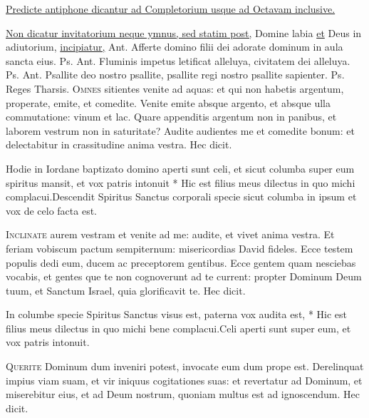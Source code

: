 \begin{multicols*}{2}
\newline \ul{Predicte antiphone dicantur ad Completorium usque ad Octavam inclusive.}
{\color{Red} }
\par \noindent \ul{Non dicatur invitatorium neque ymnus, sed statim post,} Domine labia \ul{et} Deus in adiutorium, \ul{incipiatur,} {\color{Red} Ant.} Afferte domino filii dei adorate dominum in aula sancta eius. {\color{Red} Ps.}  {\color{Red} Ant.} Fluminis impetus letificat alleluya, civitatem dei alleluya. {\color{Red} Ps.}  {\color{Red} Ant.} Psallite deo nostro psallite, psallite regi nostro psallite sapienter. {\color{Red} Ps.}  \V Reges Tharsis.
\lettrine[lines=2]{\zallmancaps \color{Red} O}{mnes} sitientes venite ad aquas: et qui non habetis argentum, properate, emite, et comedite. Venite emite absque argento, et absque ulla commutatione: vinum et lac. Quare appenditis argentum non in panibus, et laborem vestrum non in saturitate? Audite audientes me et comedite bonum: et delectabitur in crassitudine anima vestra. Hec dicit.
\begin{responsory}
{Hodie in Iordane baptizato domino aperti sunt celi, et sicut columba super eum spiritus mansit, et vox patris intonuit * Hic est filius meus dilectus in quo michi complacui.}{Descendit Spiritus Sanctus corporali specie sicut columba in ipsum et vox de celo facta est.}
\end{responsory}
\lettrine[lines=2]{\zallmancaps \color{Blue} I}{nclinate} aurem vestram et venite ad me: audite, et vivet anima vestra. Et feriam vobiscum pactum sempiternum: misericordias David fideles. Ecce testem populis dedi eum, ducem ac preceptorem gentibus. Ecce gentem quam nesciebas vocabis, et gentes que te non cognoverunt ad te current: propter Dominum Deum tuum, et Sanctum Israel, quia glorificavit te. Hec dicit.
\begin{responsory}[in-columbe]
{In columbe specie Spiritus Sanctus visus est, paterna vox audita est, * Hic est filius meus dilectus in quo michi bene complacui.}{Celi aperti sunt super eum, et vox patris intonuit.}
\end{responsory}
\lettrine[lines=2]{\zallmancaps \color{Red} Q}{uerite} Dominum dum inveniri potest, invocate eum dum prope est. Derelinquat impius viam suam, et vir iniquus cogitationes suas: et revertatur ad Dominum, et miserebitur eius, et ad Deum nostrum, quoniam multus est ad ignoscendum. Hec dicit.

\end{multicols*}
